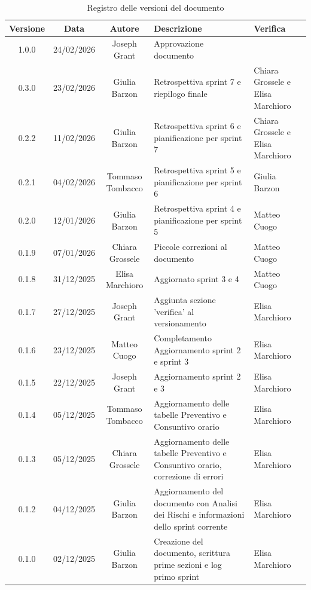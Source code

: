 \documentclass[11pt,a4paper]{article}
\begin{document}
\begin{table}[H]
    \centering
    \begin{tabular}{|c|c|c|>{\raggedright\arraybackslash}p{}|p{}|}
        \hline
        \textbf{Versione} & \textbf{Data} & \textbf{Autore} & \textbf{Descrizione} & \textbf{Verifica} \\
        \hline
        1.0.0 & 24/02/2026 & Joseph Grant & Approvazione documento & \\
        \hline
        0.3.0 & 23/02/2026 & Giulia Barzon & Retrospettiva sprint 7 e riepilogo finale & Chiara Grossele e Elisa Marchioro\\
        \hline
        0.2.2 & 11/02/2026 & Giulia Barzon & Retrospettiva sprint 6 e pianificazione per sprint 7 & Chiara Grossele e Elisa Marchioro\\
        \hline
        0.2.1 & 04/02/2026 & Tommaso Tombacco & Retrospettiva sprint 5 e pianificazione per sprint 6 & Giulia Barzon\\
        \hline
        0.2.0 & 12/01/2026 & Giulia Barzon & Retrospettiva sprint 4 e pianificazione per sprint 5 & Matteo Cuogo\\
        \hline
        0.1.9 & 07/01/2026 & Chiara Grossele & Piccole correzioni al documento & Matteo Cuogo\\ 
        \hline
        0.1.8 & 31/12/2025 & Elisa Marchioro & Aggiornato sprint 3 e 4 & Matteo Cuogo\\ \hline
        0.1.7 & 27/12/2025 & Joseph Grant & Aggiunta sezione 'verifica' al versionamento & Elisa Marchioro\\ \hline
        0.1.6 & 23/12/2025 & Matteo Cuogo & Completamento Aggiornamento sprint 2 e sprint 3 & Elisa Marchioro\\
        \hline
        0.1.5 & 22/12/2025 & Joseph Grant & Aggiornamento sprint 2 e 3 & Elisa Marchioro\\
        \hline
        0.1.4 & 05/12/2025 & Tommaso Tombacco & Aggiornamento delle tabelle Preventivo e Consuntivo orario & Elisa Marchioro\\
        \hline
        0.1.3 & 05/12/2025 & Chiara Grossele & Aggiornamento delle tabelle Preventivo e Consuntivo orario, correzione di errori & Elisa Marchioro\\
        \hline
        0.1.2 & 04/12/2025 & Giulia Barzon & Aggiornamento del documento con Analisi dei Rischi e informazioni dello sprint corrente & Elisa Marchioro\\
        \hline
        0.1.0 & 02/12/2025 & Giulia Barzon & Creazione del documento, scrittura prime sezioni e log primo sprint & Elisa Marchioro\\
        \hline
    \end{tabular}
    \caption{Registro delle versioni del documento}
    \label{tab:versionamento}
\end{table}
\end{document}
